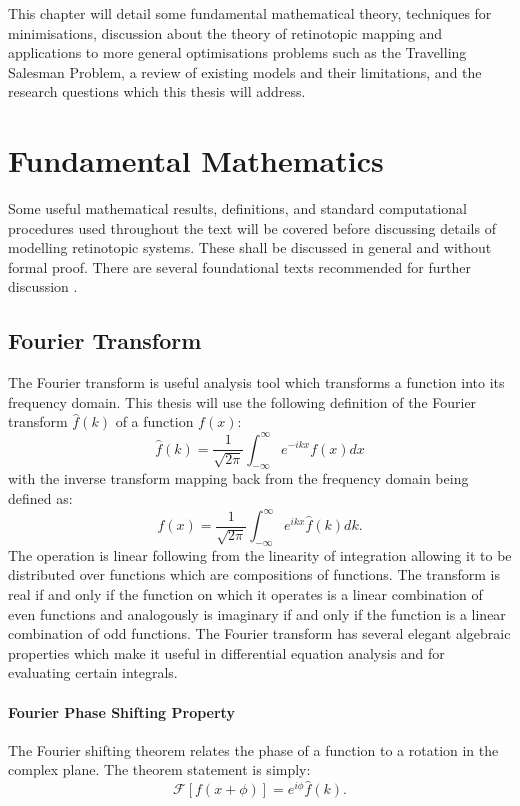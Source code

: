 This chapter will detail some fundamental mathematical theory, techniques for minimisations, discussion about the theory of retinotopic mapping and applications to more general optimisations problems such as the Travelling Salesman Problem, a review of existing models and their limitations, and the research questions which this thesis will address.
\section{Fundamental Mathematics}
Some useful mathematical results, definitions, and standard computational procedures used throughout the text will be covered before discussing details of modelling retinotopic systems. These shall be discussed in general and without formal proof. There are several foundational texts recommended for further discussion \cite{Korner1988-wt, Gelfand2000-xr, Ablowitz2003-iv, Goodfellow-et-al-2016}.
\subsection{Fourier Transform}
The Fourier transform is useful analysis tool which transforms a function into its frequency domain. This thesis will use the following definition of the Fourier transform $\hat{f}(k)$ of a function $f(x)$:
\begin{equation}
\hat{f}(k) = \frac{1}{\sqrt{2 \pi}} \int_{-\infty}^{\infty} e^{-i kx} f(x) dx
\end{equation}
with the inverse transform mapping back from the frequency domain being defined as:
\begin{equation}
f(x) = \frac{1}{\sqrt{2 \pi}} \int_{-\infty}^{\infty} e^{i kx} \hat{f}(k) dk.
\end{equation}
The operation is linear following from the linearity of integration allowing it to be distributed over functions which are compositions of functions. The transform is real if and only if the function on which it operates is a linear combination of even functions and analogously is imaginary if and only if the function is a linear combination of odd functions. The Fourier transform has several elegant algebraic properties which make it useful in differential equation analysis and for evaluating certain integrals.
\paragraph{Fourier Phase Shifting Property}
The Fourier shifting theorem relates the phase of a function to a rotation in the complex plane. The theorem statement is simply:
\begin{equation}
\mathcal{F}[f(x + \phi)] = e^{i \phi}\hat{f}(k).
\end{equation}

